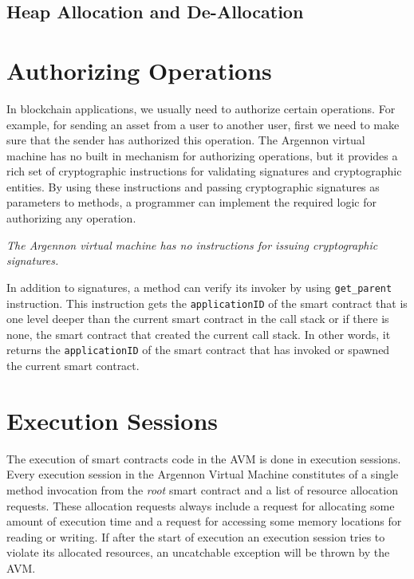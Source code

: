 \documentclass[11pt, a4paper]{report}
\newcommand{\note}[1] {
    \begin{tcolorbox}[colframe=white,colback=white]
        \emph{#1}
    \end{tcolorbox}
}
\begin{document}
    \subsection{Heap Allocation and De-Allocation}\label{subsec:heap-allocation-instructions}

    \section{Authorizing Operations}\label{sec:authorizing-operations}

    In blockchain applications, we usually need to authorize certain operations. For example, for sending an asset
    from a user to another user, first we need to make sure that the sender has authorized this operation. The
    Argennon virtual machine has no built in mechanism for authorizing operations, but it provides a rich set of
    cryptographic instructions for validating signatures and cryptographic entities. By using these instructions and
    passing cryptographic signatures as parameters to methods, a programmer can implement the required logic
    for authorizing any operation.

    \note{The Argennon virtual machine has no instructions for issuing cryptographic signatures.}

    In addition to signatures, a method can verify its invoker by using \texttt{get\_parent} instruction. This
    instruction gets the \texttt{applicationID} of the smart contract that is one level deeper than the current
    smart contract in the call stack or if there is none, the smart contract that created the current call stack.
    In other words, it returns the \texttt{applicationID} of the smart contract that has invoked or spawned
    the current smart contract.


    \section{Execution Sessions}\label{subsec:execution-sessions}

    The execution of smart contracts code in the AVM is done in execution sessions. Every execution session in the
    Argennon Virtual Machine constitutes of a single method invocation from the \emph{root} smart contract and a list
    of resource allocation requests. These allocation requests always include a request for allocating some amount
    of execution time and a request for accessing some memory locations for reading or writing. If after the start of
    execution an execution session tries to violate its allocated resources, an uncatchable exception will
    be thrown by the AVM\@.
\end{document}
